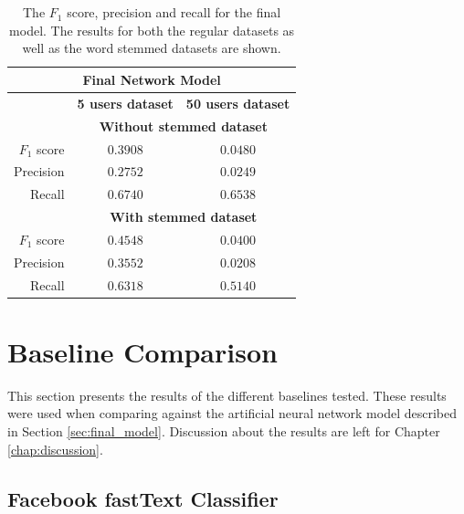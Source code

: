 \\\\
\begin{table}[h!]
    \centering
    \begin{tabular}{ r | c | c }
    \multicolumn{3}{c}{\textbf{Final Network Model}} \\ \hline
    & \textbf{5 users dataset} & \textbf{50 users dataset} \\ \hline    \hline
    & \multicolumn{2}{c}{\textbf{Without stemmed dataset}} \\ \hline \hline
    $F_1$ score & $0.3908$ & $0.0480$ \\ \hline
    Precision & $0.2752$ & $0.0249$ \\ \hline
    Recall & $0.6740$ & $0.6538$ \\ \hline \hline
    & \multicolumn{2}{c}{\textbf{With stemmed dataset}} \\ \hline \hline
    $F_1$ score & $0.4548$ & $0.0400$ \\ \hline
    Precision & $0.3552$ & $0.0208$ \\ \hline
    Recall & $0.6318$ & $0.5140$ \\ \hline
    \end{tabular}
    \caption{The $F_1$ score, precision and recall for the final model. The results for both the regular datasets as well as the word stemmed datasets are shown.}
    \label{table:final_all_results}
\end{table}

\section{Baseline Comparison} 
\label{sec:baseline_comp}
This section presents the results of the different baselines tested. These results were used when comparing against the artificial neural network model described in Section \ref{sec:final_model}. Discussion about the results are left for Chapter \ref{chap:discussion}.

\subsection{Facebook fastText Classifier}

